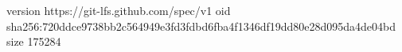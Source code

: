 version https://git-lfs.github.com/spec/v1
oid sha256:720ddce9738bb2c564949e3fd3fdbd6fba4f1346df19dd80e28d095da4de04bd
size 175284
